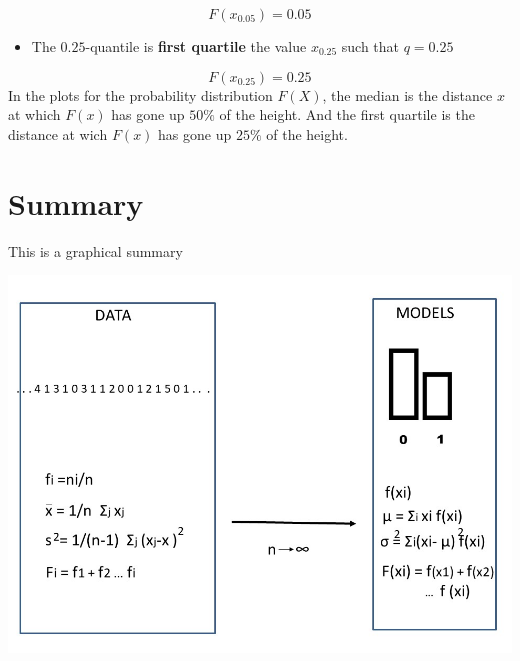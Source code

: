 \documentclass[
]{book}
\providecommand{\tightlist}{%
  \setlength{\itemsep}{0pt}\setlength{\parskip}{0pt}}
\begin{document}
\[F(x_{0.05})=0.05\]

\begin{itemize}
\tightlist
\item
  The \(0.25\)-quantile is \textbf{first quartile} the value \(x_{0.25}\) such that \(q=0.25\)
\end{itemize}

\[F(x_{0.25})=0.25\]
In the plots for the probability distribution \(F(X)\), the median is the distance \(x\) at which \(F(x)\) has gone up \(50\%\) of the height. And the first quartile is the distance at wich \(F(x)\) has gone up \(25\%\) of the height.

\hypertarget{summary}{%
\section{Summary}\label{summary}}

This is a graphical summary

\includegraphics{./figures/randomvarsum.JPG}
\end{document}
